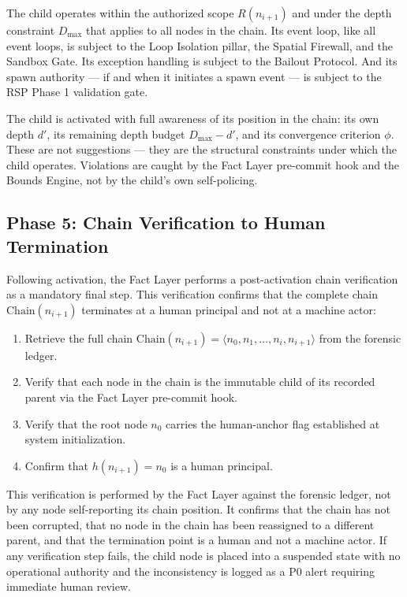 The child operates within the authorized scope $R(n_{i+1})$ and under the depth constraint $D_{\max}$ that applies to all nodes in the chain. Its event loop, like all \bxthree{} event loops, is subject to the Loop Isolation pillar, the Spatial Firewall, and the Sandbox Gate. Its exception handling is subject to the Bailout Protocol. And its spawn authority — if and when it initiates a spawn event — is subject to the RSP Phase 1 validation gate.

The child is activated with full awareness of its position in the chain: its own depth $d'$, its remaining depth budget $D_{\max} - d'$, and its convergence criterion $\phi$. These are not suggestions — they are the structural constraints under which the child operates. Violations are caught by the Fact Layer pre-commit hook and the Bounds Engine, not by the child's own self-policing.

\subsection{Phase 5: Chain Verification to Human Termination}

Following activation, the Fact Layer performs a post-activation chain verification as a mandatory final step. This verification confirms that the complete chain $\mathrm{Chain}(n_{i+1})$ terminates at a human principal and not at a machine actor:

\begin{enumerate}
  \item Retrieve the full chain $\mathrm{Chain}(n_{i+1}) = \langle n_0, n_1, \ldots, n_i, n_{i+1} \rangle$ from the forensic ledger.
  \item Verify that each node in the chain is the immutable child of its recorded parent via the Fact Layer pre-commit hook.
  \item Verify that the root node $n_0$ carries the human-anchor flag established at system initialization.
  \item Confirm that $h(n_{i+1}) = n_0$ is a human principal.
\end{enumerate}

This verification is performed by the Fact Layer against the forensic ledger, not by any node self-reporting its chain position. It confirms that the chain has not been corrupted, that no node in the chain has been reassigned to a different parent, and that the termination point is a human and not a machine actor. If any verification step fails, the child node is placed into a suspended state with no operational authority and the inconsistency is logged as a P0 alert requiring immediate human review.


